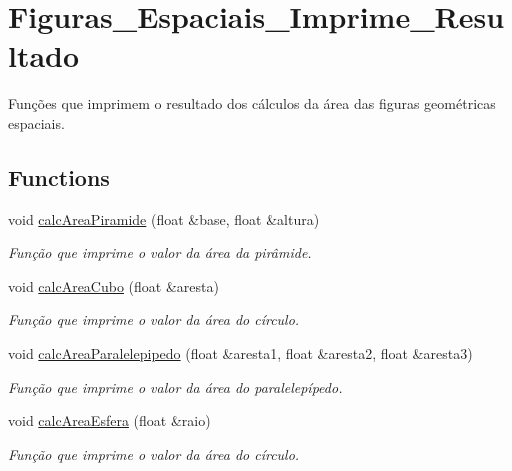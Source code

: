 \hypertarget{group__Figuras__Espaciais__Imprime__Resultado}{}\section{Figuras\+\_\+\+Espaciais\+\_\+\+Imprime\+\_\+\+Resultado}
\label{group__Figuras__Espaciais__Imprime__Resultado}


Funções que imprimem o resultado dos cálculos da área das figuras geométricas espaciais.  


\subsection*{Functions}
\begin{DoxyCompactItemize}
\item 
void \hyperlink{group__Figuras__Espaciais__Imprime__Resultado_gae484b707bcee07b0c5580440923326aa}{calc\+Area\+Piramide} (float \&base, float \&altura)
\begin{DoxyCompactList}\small\item\em Função que imprime o valor da área da pirâmide. \end{DoxyCompactList}\item 
void \hyperlink{group__Figuras__Espaciais__Imprime__Resultado_ga54aa7364c2caf59fa3d1b1b303901050}{calc\+Area\+Cubo} (float \&aresta)
\begin{DoxyCompactList}\small\item\em Função que imprime o valor da área do círculo. \end{DoxyCompactList}\item 
void \hyperlink{group__Figuras__Espaciais__Imprime__Resultado_ga153e7a3b91362f17f7f22919dde85ebc}{calc\+Area\+Paralelepipedo} (float \&aresta1, float \&aresta2, float \&aresta3)
\begin{DoxyCompactList}\small\item\em Função que imprime o valor da área do paralelepípedo. \end{DoxyCompactList}\item 
void \hyperlink{group__Figuras__Espaciais__Imprime__Resultado_ga3a49e8821532ada5f803c815f8d99825}{calc\+Area\+Esfera} (float \&raio)
\begin{DoxyCompactList}\small\item\em Função que imprime o valor da área do círculo. \end{DoxyCompactList}\end{DoxyCompactItemize}


